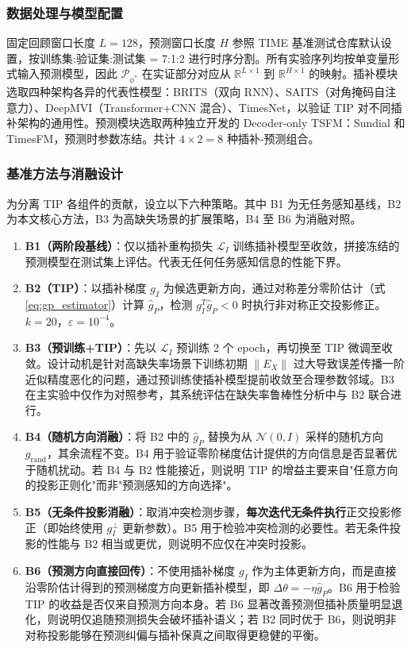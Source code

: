 \documentclass{article}
\begin{document}
\subsubsection{数据处理与模型配置}

固定回顾窗口长度 $L=128$，预测窗口长度 $H$ 参照 TIME 基准测试仓库默认设置，按训练集:验证集:测试集 = 7:1:2 进行时序分割。所有实验序列均按单变量形式输入预测模型，因此 $\mathcal{P}_{\phi^\ast}$ 在实证部分对应从 $\mathbb{R}^{L\times 1}$ 到 $\mathbb{R}^{H\times 1}$ 的映射。插补模块选取四种架构各异的代表性模型：BRITS\citep{NEURIPS2018_734e6bfc}（双向 RNN）、SAITS\citep{du2023saits}（对角掩码自注意力）、DeepMVI\citep{ZHANG202167}（Transformer+CNN 混合）、TimesNet\citep{wu2023timesnet}，以验证 TIP 对不同插补架构的通用性。预测模块选取两种独立开发的 Decoder-only TSFM：Sundial\citep{pmlr-v267-liu25be} 和 TimesFM\citep{pmlr-v235-das24c}，预测时参数冻结。共计 $4 \times 2 = 8$ 种插补-预测组合。

\subsubsection{基准方法与消融设计}

为分离 TIP 各组件的贡献，设立以下六种策略。其中 B1 为无任务感知基线，B2 为本文核心方法，B3 为高缺失场景的扩展策略，B4 至 B6 为消融对照。

\begin{enumerate}
	\item \textbf{B1（两阶段基线）}：仅以插补重构损失 $\mathcal{L}_I$ 训练插补模型至收敛，拼接冻结的预测模型在测试集上评估。代表无任何任务感知信息的性能下界。
	\item \textbf{B2（TIP）}：以插补梯度 $g_I$ 为候选更新方向，通过对称差分零阶估计（式\ref{eq:gp_estimator}）计算 $\hat{g}_P$，检测 $g_I^T \hat{g}_P < 0$ 时执行非对称正交投影修正。$k=20$，$\varepsilon=10^{-4}$。
	\item \textbf{B3（预训练+TIP）}：先以 $\mathcal{L}_I$ 预训练 2 个 epoch，再切换至 TIP 微调至收敛。设计动机是针对高缺失率场景下训练初期 $\|E_X\|$ 过大导致误差传播一阶近似精度恶化的问题，通过预训练使插补模型提前收敛至合理参数邻域。B3 在主实验中仅作为对照参考，其系统评估在缺失率鲁棒性分析中与 B2 联合进行。
	\item \textbf{B4（随机方向消融）}：将 B2 中的 $\hat{g}_P$ 替换为从 $\mathcal{N}(0, I)$ 采样的随机方向 $g_{\text{rand}}$，其余流程不变。B4 用于验证零阶梯度估计提供的方向信息是否显著优于随机扰动。若 B4 与 B2 性能接近，则说明 TIP 的增益主要来自"任意方向的投影正则化"而非"预测感知的方向选择"。
	\item \textbf{B5（无条件投影消融）}：取消冲突检测步骤，\textbf{每次迭代无条件执行}正交投影修正（即始终使用 $g_I^\perp$ 更新参数）。B5 用于检验冲突检测的必要性。若无条件投影的性能与 B2 相当或更优，则说明不应仅在冲突时投影。
	\item \textbf{B6（预测方向直接回传）}：不使用插补梯度 $g_I$ 作为主体更新方向，而是直接沿零阶估计得到的预测梯度方向更新插补模型，即 $\Delta\theta=-\eta\hat{g}_P$。B6 用于检验 TIP 的收益是否仅来自预测方向本身。若 B6 显著改善预测但插补质量明显退化，则说明仅追随预测损失会破坏插补语义；若 B2 同时优于 B6，则说明非对称投影能够在预测纠偏与插补保真之间取得更稳健的平衡。
\end{enumerate}
\end{document}
